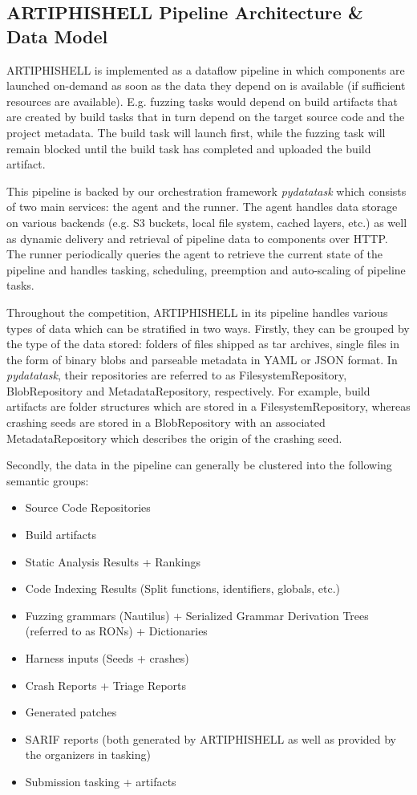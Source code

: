 \subsection{ARTIPHISHELL Pipeline Architecture \& Data Model}

ARTIPHISHELL is implemented as a dataflow pipeline in which components are launched on-demand as soon as the data they depend on is available (if sufficient resources are available).
E.g. fuzzing tasks would depend on build artifacts that are created by build tasks that in turn depend on the target source code and the project metadata. The build task will launch first, while the fuzzing task will remain blocked until the build task has completed and uploaded the build artifact.

This pipeline is backed by our orchestration framework \textit{pydatatask} which consists of two main services: the agent and the runner.
The agent handles data storage on various backends (e.g. S3 buckets, local file system, cached layers, etc.) as well as dynamic delivery and retrieval of pipeline data to components over HTTP.
The runner periodically queries the agent to retrieve the current state of the pipeline and handles tasking, scheduling, preemption and auto-scaling of pipeline tasks.

Throughout the competition, ARTIPHISHELL in its pipeline handles various types of data which can be stratified in two ways.
Firstly, they can be grouped by the type of the data stored: folders of files shipped as tar archives, single files in the form of binary blobs and parseable metadata in YAML or JSON format.
In \textit{pydatatask}, their repositories are referred to as FilesystemRepository, BlobRepository and MetadataRepository, respectively.
For example, build artifacts are folder structures which are stored in a FilesystemRepository, whereas crashing seeds are stored in a BlobRepository with an associated MetadataRepository which describes the origin of the crashing seed.

Secondly, the data in the pipeline can generally be clustered into the following semantic groups:

\begin{itemize}
    \item Source Code Repositories
    \item Build artifacts
    \item Static Analysis Results + Rankings
    \item Code Indexing Results (Split functions, identifiers, globals, etc.)
    \item Fuzzing grammars (Nautilus) + Serialized Grammar Derivation Trees (referred to as RONs) + Dictionaries
    \item Harness inputs (Seeds + crashes)
    \item Crash Reports + Triage Reports
    \item Generated patches
    \item SARIF reports (both generated by ARTIPHISHELL as well as provided by the organizers in tasking)
    \item Submission tasking + artifacts
\end{itemize}


